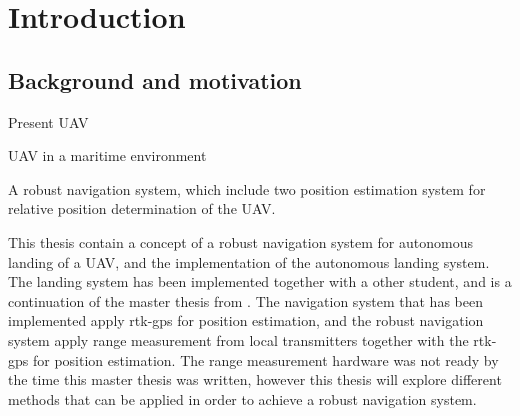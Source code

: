 
\chapter{Introduction}

\section{Background and motivation}
Present UAV

UAV in a maritime environment

A robust navigation system, which include two position estimation system for relative position determination of the UAV. 

This thesis contain a concept of a robust navigation system for autonomous landing of a UAV, and the implementation of the autonomous landing system. The landing system has been implemented together with a other student, and is a continuation of the master thesis from \citep{Froelich}. The navigation system that has been implemented apply rtk-gps for position estimation, and the robust navigation system apply range measurement from local transmitters together with the rtk-gps for position estimation. The range measurement hardware was not ready by the time this master thesis was written, however this thesis will explore different methods that can be applied in order to achieve a robust navigation system.

